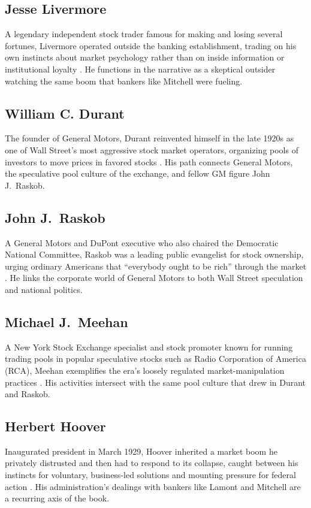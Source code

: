\documentclass[11pt]{article}
\begin{document}
\subsection{Jesse Livermore}
A legendary independent stock trader famous for making and losing several fortunes,
Livermore operated outside the banking establishment, trading on his own instincts
about market psychology rather than on inside information or institutional loyalty
\autocite{airmail1929,supersummary1929}. He functions in the narrative as a
skeptical outsider watching the same boom that bankers like Mitchell were fueling.

\subsection{William C. Durant}
The founder of General Motors, Durant reinvented himself in the late 1920s as one of
Wall Street's most aggressive stock market operators, organizing pools of investors
to move prices in favored stocks \autocite{supersummary1929}. His path connects
General Motors, the speculative pool culture of the exchange, and fellow GM figure
John J.\ Raskob.

\subsection{John J.\ Raskob}
A General Motors and DuPont executive who also chaired the Democratic National
Committee, Raskob was a leading public evangelist for stock ownership, urging
ordinary Americans that ``everybody ought to be rich'' through the market
\autocite{supersummary1929,littlerbooks1929}. He links the corporate world of
General Motors to both Wall Street speculation and national politics.

\subsection{Michael J.\ Meehan}
A New York Stock Exchange specialist and stock promoter known for running trading
pools in popular speculative stocks such as Radio Corporation of America (RCA),
Meehan exemplifies the era's loosely regulated market-manipulation practices
\autocite{supersummary1929}. His activities intersect with the same pool culture
that drew in Durant and Raskob.

\subsection{Herbert Hoover}
Inaugurated president in March 1929, Hoover inherited a market boom he privately
distrusted and then had to respond to its collapse, caught between his instincts for
voluntary, business-led solutions and mounting pressure for federal action
\autocite{supersummary1929,csmonitor1929}. His administration's dealings with bankers
like Lamont and Mitchell are a recurring axis of the book.
\end{document}

